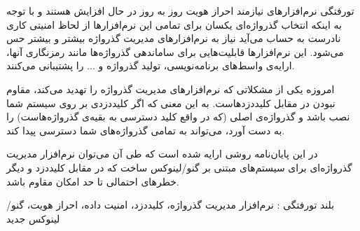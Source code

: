 


\pagestyle{empty}

‌تورفتگی
نرم‌افزارهای نیازمند احراز هویت روز به روز در حال افزایش هستند و با توجه به اینکه انتخاب گذرواژه‌ای یکسان برای تمامی این نرم‌افزارها از لحاظ امنیتی کاری نادرست به حساب می‌آید نیاز به نرم‌افزارهای مدیریت گذرواژه بیشتر و بیشتر حس می‌شود. این نرم‌افزارها قابلیت‌هایی برای ساماندهی گذرواژه‌ها مانند رمزنگاری آنها، ارایه‌ی واسط‌های برنامه‌نویسی، تولید گذرواژه و ... را پشتیبانی می‌کنند.

امروزه یکی از مشکلاتی که نرم‌افزارهای مدیریت گذرواژه را تهدید می‌کند، مقاوم نبودن در مقابل کلیددزدهاست. به این معنی که اگر کلیددزدی بر روی سیستم شما نصب باشد و گذرواژه‌ی اصلی (که در واقع کلید دسترسی به بقیه‌ی گذرواژ‌ه‌هاست) را به دست آورد، می‌تواند به تمامی گذرواژه‌های شما دسترسی پیدا کند.
 
در این پایان‌نامه روشی ارایه شده است که طی آن می‌توان نرم‌افزار مدیریت گذرواژه‌ای برای سیستم‌های مبتنی بر گنو/لینوکس ساخت که در مقابل کلید‌دزد و دیگر خطر‌های احتمالی تا حد امکان مقاوم باشد.
 
‌بلند
‌تورفتگی : 
نرم‌افزار مدیریت گذرواژه، کلید‌دزد، امنیت داده، احراز هویت، گنو/لینوکس
‌جدید
